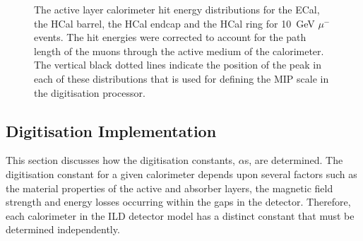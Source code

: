 \begin{figure}[h!]
\caption[The active layer calorimeter hit energy distributions for \protect{} the ECal, \protect{} the HCal barrel, \protect{} the HCal endcap and \protect{} the HCal ring for 10~GeV $\mu^{-}$ events.  The hit energies were corrected to account for the path length of the muons through the active medium of the calorimeter.  The vertical black dotted lines indicate the position of the peak in each of these distributions that is used for defining the MIP scale in the digitisation processor.]{The active layer calorimeter hit energy distributions for \protect{} the ECal, \protect{} the HCal barrel, \protect{} the HCal endcap and \protect{} the HCal ring for 10~GeV $\mu^{-}$ events.  The hit energies were corrected to account for the path length of the muons through the active medium of the calorimeter.  The vertical black dotted lines indicate the position of the peak in each of these distributions that is used for defining the MIP scale in the digitisation processor.}
\label{fig:digitisermip}
\end{figure}


\subsection{Digitisation Implementation}
\label{sec:digi}
This section discusses how the digitisation constants, $\alpha$s, are determined.  The digitisation constant for a given calorimeter depends upon several factors such as the material properties of the active and absorber layers, the magnetic field strength and energy losses occurring within the gaps in the detector.  Therefore, each calorimeter in the ILD detector model has a distinct constant that must be determined independently. 


